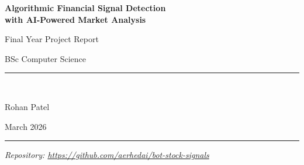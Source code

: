 \documentclass[12pt,a4paper]{article}
\begin{document}
\begin{titlepage}
    \centering
    \vspace*{2cm}

    {\LARGE\bfseries Algorithmic Financial Signal Detection\\[0.4em]
    with AI-Powered Market Analysis\par}

    \vspace{1.5cm}
    {\large Final Year Project Report\par}
    \vspace{0.5cm}
    {\large BSc Computer Science\par}

    \vspace{2cm}
    \rule{0.5\textwidth}{0.4pt}\\[0.5em]
    {\large Rohan Patel\par}
    \vspace{0.3cm}
    {\normalsize March 2026\par}
    \rule{0.5\textwidth}{0.4pt}

    \vspace{2cm}
    \begin{abstract}
    \noindent
    This report describes the design, implementation, and evaluation of a fullstack financial signals platform combining classical quantitative valuation strategies, real-time news monitoring, and a large language model (LLM) agent to surface actionable investment signals for retail investors. The system scans a watchlist of 436 stocks across 16 market sectors and a curated list of cryptocurrencies, delivers alerts via Telegram, and presents a live dashboard with AI-generated market analysis. Developed iteratively over five months from November 2025 to March 2026, the project documents a series of architectural decisions---from a Telegram-only alert system through to a fully agent-orchestrated dashboard with per-ticker news enrichment---reflecting the progressive maturation of both the feature set and the underlying design. The report follows the actual sequence of development decisions as recorded in the project's version control history, contextualising each decision against its technical motivation and the academic literature on value investing, technical analysis, and LLM agent systems.
    \end{abstract}

    \vfill
    \textit{Repository: \url{https://github.com/aerhedai/bot-stock-signals}}
\end{titlepage}
\end{document}
